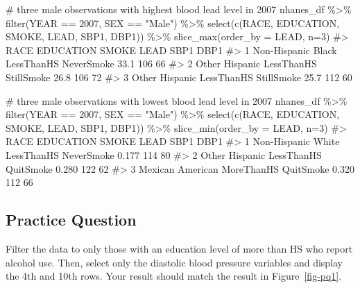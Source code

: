 \documentclass[
  letterpaper,
]{krantz}
\makeatletter
\newenvironment{Shaded}{\begin{snugshade}}{\end{snugshade}}
\newcommand{\AttributeTok}[1]{\textcolor[rgb]{0.40,0.45,0.13}{#1}}
\newcommand{\CommentTok}[1]{\textcolor[rgb]{0.37,0.37,0.37}{#1}}
\newcommand{\DecValTok}[1]{\textcolor[rgb]{0.68,0.00,0.00}{#1}}
\newcommand{\FunctionTok}[1]{\textcolor[rgb]{0.28,0.35,0.67}{#1}}
\newcommand{\NormalTok}[1]{\textcolor[rgb]{0.00,0.23,0.31}{#1}}
\newcommand{\SpecialCharTok}[1]{\textcolor[rgb]{0.37,0.37,0.37}{#1}}
\newcommand{\StringTok}[1]{\textcolor[rgb]{0.13,0.47,0.30}{#1}}
\newenvironment{kframe}{%
\medskip{}
\setlength{\fboxsep}{.8em}
 \def\at@end@of@kframe{}%
 \ifinner\ifhmode%
  \def\at@end@of@kframe{\end{minipage}}%
  \begin{minipage}{\columnwidth}%
 \fi\fi%
 \def\FrameCommand##1{\hskip\@totalleftmargin \hskip-\fboxsep
 \colorbox{shadecolor}{##1}\hskip-\fboxsep
     \hskip-\linewidth \hskip-\@totalleftmargin \hskip\columnwidth}%
 \MakeFramed {\advance\hsize-\width
   \@totalleftmargin\z@ \linewidth\hsize
   \@setminipage}}%
 {\par\unskip\endMakeFramed%
 \at@end@of@kframe}
\renewenvironment{Shaded}{\begin{kframe}}{\end{kframe}}
\makeatother
\begin{document}
\begin{Shaded}
\begin{Highlighting}[]
\CommentTok{\# three male observations with highest blood lead level in 2007}
\NormalTok{nhanes\_df }\SpecialCharTok{\%\textgreater{}\%}
  \FunctionTok{filter}\NormalTok{(YEAR }\SpecialCharTok{==} \DecValTok{2007}\NormalTok{, SEX }\SpecialCharTok{==} \StringTok{"Male"}\NormalTok{) }\SpecialCharTok{\%\textgreater{}\%}
  \FunctionTok{select}\NormalTok{(}\FunctionTok{c}\NormalTok{(RACE, EDUCATION, SMOKE, LEAD, SBP1, DBP1)) }\SpecialCharTok{\%\textgreater{}\%}
  \FunctionTok{slice\_max}\NormalTok{(}\AttributeTok{order\_by =}\NormalTok{ LEAD, }\AttributeTok{n=}\DecValTok{3}\NormalTok{)}
\CommentTok{\#\textgreater{}                 RACE  EDUCATION      SMOKE LEAD SBP1 DBP1}
\CommentTok{\#\textgreater{} 1 Non{-}Hispanic Black LessThanHS NeverSmoke 33.1  106   66}
\CommentTok{\#\textgreater{} 2     Other Hispanic LessThanHS StillSmoke 26.8  106   72}
\CommentTok{\#\textgreater{} 3     Other Hispanic LessThanHS StillSmoke 25.7  112   60}

\CommentTok{\# three male observations with lowest blood lead level in 2007}
\NormalTok{nhanes\_df }\SpecialCharTok{\%\textgreater{}\%}
  \FunctionTok{filter}\NormalTok{(YEAR }\SpecialCharTok{==} \DecValTok{2007}\NormalTok{, SEX }\SpecialCharTok{==} \StringTok{"Male"}\NormalTok{) }\SpecialCharTok{\%\textgreater{}\%}
  \FunctionTok{select}\NormalTok{(}\FunctionTok{c}\NormalTok{(RACE, EDUCATION, SMOKE, LEAD, SBP1, DBP1)) }\SpecialCharTok{\%\textgreater{}\%}
  \FunctionTok{slice\_min}\NormalTok{(}\AttributeTok{order\_by =}\NormalTok{ LEAD, }\AttributeTok{n=}\DecValTok{3}\NormalTok{)}
\CommentTok{\#\textgreater{}                 RACE  EDUCATION      SMOKE  LEAD SBP1 DBP1}
\CommentTok{\#\textgreater{} 1 Non{-}Hispanic White LessThanHS NeverSmoke 0.177  114   80}
\CommentTok{\#\textgreater{} 2     Other Hispanic LessThanHS  QuitSmoke 0.280  122   62}
\CommentTok{\#\textgreater{} 3   Mexican American MoreThanHS  QuitSmoke 0.320  112   66}
\end{Highlighting}
\end{Shaded}

\hypertarget{practice-question-8}{%
\subsection{Practice Question}\label{practice-question-8}}

Filter the data to only those with an education level of more than HS
who report alcohol use. Then, select only the diastolic blood pressure
variables and display the 4th and 10th rows. Your result should match
the result in Figure~\ref{fig-pq1}.
\end{document}
